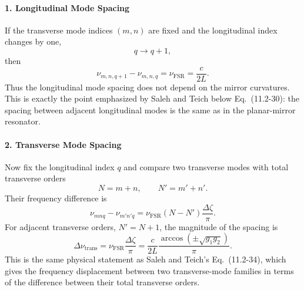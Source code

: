 \begin{resolucao}[Solution]
    \paragraph*{1. Longitudinal Mode Spacing}
        If the transverse mode indices $(m,n)$ are fixed and the longitudinal index changes by one,
        \begin{equation}
            q\rightarrow q+1,
        \end{equation}
        then
        \begin{equation}
            \nu_{m,n,q+1}-\nu_{m,n,q}
            =
            \nu_{\mathrm{FSR}}
            =
            \frac{c}{2L}.
            \label{eq:longitudinal_spacing}
        \end{equation}
        Thus the longitudinal mode spacing does not depend on the mirror curvatures. This is exactly the point emphasized by Saleh and Teich below Eq.~(11.2-30): the spacing between adjacent longitudinal modes is the same as in the planar-mirror resonator.

    \paragraph*{2. Transverse Mode Spacing}
        Now fix the longitudinal index $q$ and compare two transverse modes with total transverse orders
        \begin{equation}
            N=m+n,
            \qquad
            N'=m'+n'.
        \end{equation}
        Their frequency difference is
        \begin{equation}
            \nu_{mnq}-\nu_{m'n'q}
            =
            \nu_{\mathrm{FSR}}
            (N-N')
            \frac{\Delta\zeta}{\pi}.
            \label{eq:transverse_spacing_general}
        \end{equation}
        For adjacent transverse orders, $N'=N+1$, the magnitude of the spacing is
        \begin{equation}
            \Delta\nu_{\mathrm{trans}}
            =
            \nu_{\mathrm{FSR}}
            \frac{\Delta\zeta}{\pi}
            =
            \frac{c}{2L}
            \frac{
                \arccos\left(
                    \pm\sqrt{g_1g_2}
                \right)
            }{\pi}.
            \label{eq:transverse_spacing}
        \end{equation}
        This is the same physical statement as Saleh and Teich's Eq.~(11.2-34), which gives the frequency displacement between two transverse-mode families in terms of the difference between their total transverse orders.


\end{resolucao}
